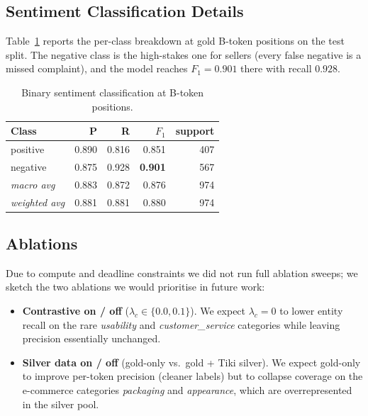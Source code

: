 \documentclass[conference]{IEEEtran}
\begin{document}
\subsection{Sentiment Classification Details}

Table~\ref{tab:sentiment} reports the per-class breakdown at gold
B-token positions on the test split. The negative class is the
high-stakes one for sellers (every false negative is a missed
complaint), and the model reaches $F_1 = 0.901$ there with
recall $0.928$.

\begin{table}[t]
\caption{Binary sentiment classification at B-token positions.}
\label{tab:sentiment}
\centering
\begin{tabular}{lrrrr}
\toprule
Class    & P     & R     & $F_1$ & support \\
\midrule
positive & 0.890 & 0.816 & 0.851 & 407 \\
negative & 0.875 & 0.928 & \textbf{0.901} & 567 \\
\midrule
\textit{macro avg}    & 0.883 & 0.872 & 0.876 & 974 \\
\textit{weighted avg} & 0.881 & 0.881 & 0.880 & 974 \\
\bottomrule
\end{tabular}
\end{table}

\subsection{Ablations}\label{sec:ablation}

Due to compute and deadline constraints we did not run full ablation
sweeps; we sketch the two ablations we would prioritise in future work:
\begin{itemize}
    \item \textbf{Contrastive on / off} ($\lambda_c \in \{0.0, 0.1\}$).
    We expect $\lambda_c = 0$ to lower entity recall on the rare
    \textit{usability} and \textit{customer\_service} categories while
    leaving precision essentially unchanged.
    \item \textbf{Silver data on / off} (gold-only vs.\ gold + Tiki
    silver). We expect gold-only to improve per-token precision
    (cleaner labels) but to collapse coverage on the e-commerce
    categories \textit{packaging} and \textit{appearance}, which are
    overrepresented in the silver pool.
\end{itemize}

\end{document}
